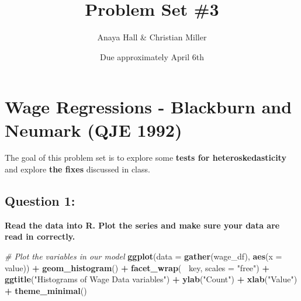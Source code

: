 \documentclass[11pt,]{article}
\title{Problem Set \#3}
\author{Anaya Hall \& Christian Miller}
\date{Due approximately April 6th}
\newenvironment{Shaded}{\begin{snugshade}}{\end{snugshade}}
\newcommand{\KeywordTok}[1]{\textcolor[rgb]{0.13,0.29,0.53}{\textbf{#1}}}
\newcommand{\DataTypeTok}[1]{\textcolor[rgb]{0.13,0.29,0.53}{#1}}
\newcommand{\StringTok}[1]{\textcolor[rgb]{0.31,0.60,0.02}{#1}}
\newcommand{\CommentTok}[1]{\textcolor[rgb]{0.56,0.35,0.01}{\textit{#1}}}
\newcommand{\OperatorTok}[1]{\textcolor[rgb]{0.81,0.36,0.00}{\textbf{#1}}}
\newcommand{\NormalTok}[1]{#1}
\begin{document}
\maketitle

\section{Wage Regressions - Blackburn and Neumark (QJE
1992)}\label{wage-regressions---blackburn-and-neumark-qje-1992}

The goal of this problem set is to explore some \textbf{tests for
heteroskedasticity} and explore \textbf{the fixes} discussed in class.

\subsection{Question 1:}\label{question-1}

\textbf{Read the data into R. Plot the series and make sure your data
are read in correctly.}

\begin{Shaded}
\end{Shaded}

\begin{Shaded}
\begin{Highlighting}[]
\CommentTok{# Plot the variables in our model}
\KeywordTok{ggplot}\NormalTok{(}\DataTypeTok{data =} \KeywordTok{gather}\NormalTok{(wage_df), }\KeywordTok{aes}\NormalTok{(}\DataTypeTok{x =}\NormalTok{ value)) }\OperatorTok{+}
\KeywordTok{geom_histogram}\NormalTok{() }\OperatorTok{+}
\KeywordTok{facet_wrap}\NormalTok{(}\OperatorTok{~}\StringTok{ }\NormalTok{key, }\DataTypeTok{scales =} \StringTok{"free"}\NormalTok{) }\OperatorTok{+}
\KeywordTok{ggtitle}\NormalTok{(}\StringTok{"Histograms of Wage Data variables"}\NormalTok{) }\OperatorTok{+}
\KeywordTok{ylab}\NormalTok{(}\StringTok{"Count"}\NormalTok{) }\OperatorTok{+}
\KeywordTok{xlab}\NormalTok{(}\StringTok{"Value"}\NormalTok{) }\OperatorTok{+}\StringTok{ }\KeywordTok{theme_minimal}\NormalTok{()}
\end{Highlighting}
\end{Shaded}
\end{document}
